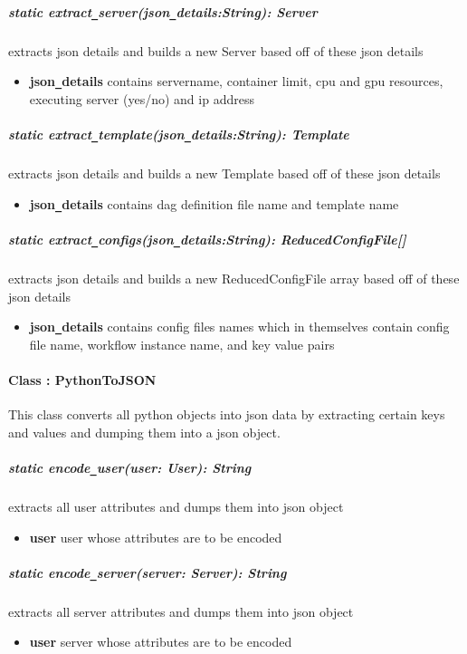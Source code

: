 \subparagraph{static extract\texttt{\_}server(json\texttt{\_}details:String): Server}
extracts json details and builds a new Server based off of these json details
\begin{itemize}
        \item \textbf{json\texttt{\_}details}
        contains servername, container limit, cpu and gpu resources, executing server (yes/no) and ip address
\end{itemize}

\subparagraph{static extract\texttt{\_}template(json\texttt{\_}details:String): Template}
extracts json details and builds a new Template based off of these json details
\begin{itemize}
        \item \textbf{json\texttt{\_}details}
        contains dag definition file name and template name
\end{itemize}

\subparagraph{static extract\texttt{\_}configs(json\texttt{\_}details:String): ReducedConfigFile[]}
extracts json details and builds a new ReducedConfigFile array based off of these json details
\begin{itemize}
        \item \textbf{json\texttt{\_}details}
        contains config files names which in themselves contain config file name, workflow instance name,
        and key value pairs
\end{itemize}

\paragraph{Class : PythonToJSON}
This class converts all python objects into json data by extracting certain keys and values and dumping
them into a json object.

\subparagraph{static encode\texttt{\_}user(user: User): String}
extracts all user attributes and dumps them into json object
\begin{itemize}
        \item \textbf{user}
        user whose attributes are to be encoded
\end{itemize}

\subparagraph{static encode\texttt{\_}server(server: Server): String}
extracts all server attributes and dumps them into json object
\begin{itemize}
        \item \textbf{user}
        server whose attributes are to be encoded
\end{itemize}

